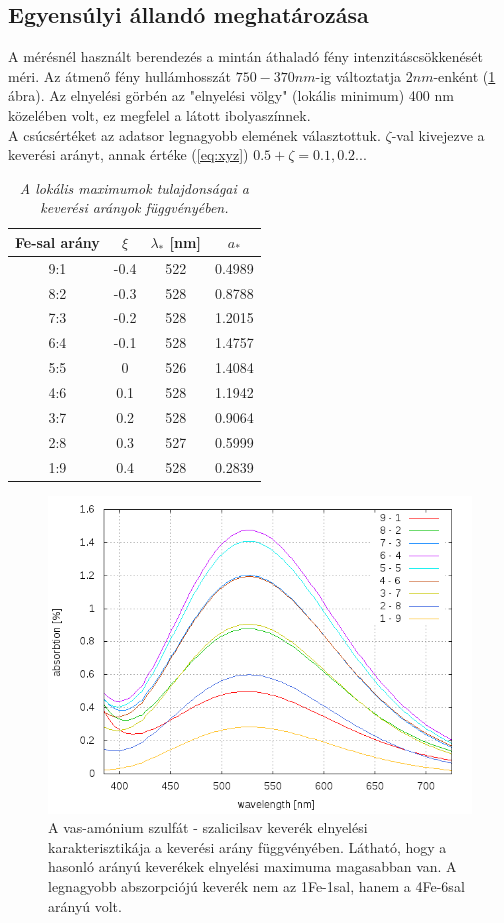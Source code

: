 \documentclass[20pt]{article}
\numberwithin{equation}{section}
\numberwithin{figure}{section}
\numberwithin{table}{section}
\begin{document}
	\subsection{Egyensúlyi állandó meghatározása}
	A mérésnél használt berendezés a mintán áthaladó fény intenzitáscsökkenését méri. Az átmenő fény hullámhosszát $750-370nm$-ig változtatja $2nm$-enként (\ref{fig:absz} ábra). Az elnyelési görbén az "elnyelési völgy" (lokális minimum) 400 nm közelében volt, ez megfelel a látott ibolyaszínnek. \\A csúcsértéket az adatsor legnagyobb elemének választottuk. $\zeta$-val kivejezve a keverési arányt, annak értéke (\ref{eq:xyz}) $0.5+\zeta = 0.1, 0.2 ...$\\
	\begin{table}[h!]
		\begin{center}
			\begin{tabular}{|c|c|c|c|}
				\hline
				Fe-sal arány & $\xi$ & $\lambda_{*}$ [nm] & $a_{*}$\\
				\hline
				9:1 & -0.4 & 522 & 0.4989 \\
				\hline
				8:2 & -0.3 & 528 & 0.8788 \\
				\hline
				7:3 & -0.2 & 528 & 1.2015 \\
				\hline
				6:4 & -0.1 & 528 & 1.4757 \\
				\hline
				5:5 & 0 & 526 & 1.4084 \\
				\hline
				4:6 & 0.1 & 528 & 1.1942 \\
				\hline
				3:7 & 0.2 & 528 & 0.9064 \\
				\hline
				2:8 & 0.3 & 527 & 0.5999 \\
				\hline
				1:9 & 0.4 & 528 & 0.2839 \\
				\hline
			\end{tabular}
			\caption{\textit{A lokális maximumok tulajdonságai a keverési arányok függvényében.}}
			\label{tab:maxes}
		\end{center}
	\end{table}
	\begin{figure}[h!]
		\centering
		\includegraphics[width=.5\textwidth]{abszorbcios_csucsok.png}
		\caption[Abszorbciós csúcsok]{A vas-amónium szulfát - szalicilsav keverék elnyelési karakterisztikája a keverési arány függvényében. Látható, hogy a hasonló arányú keverékek elnyelési maximuma magasabban van. A legnagyobb abszorpciójú keverék nem az 1Fe-1sal, hanem a 4Fe-6sal arányú volt. \label{fig:absz}}
	\end{figure}\\
\end{document}
